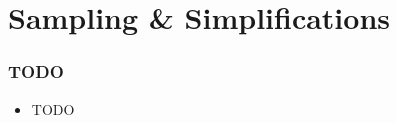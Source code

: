 \section{Sampling \& Simplifications}
    \begin{frame}[t]
        \frametitle{TODO}
        
        \vspace{-0.5em}
        \begin{itemize}
            \item TODO
        \end{itemize}

        \onslide %
    \end{frame}

